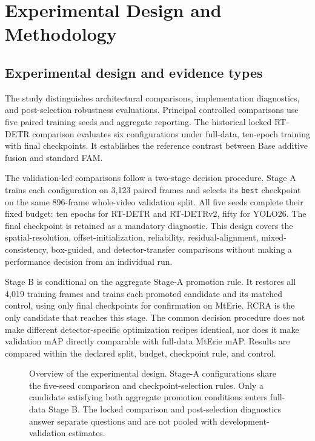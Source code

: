 \chapter{Experimental Design and Methodology}
\label{chap:methodology}

\section{Experimental design and evidence types}

The study distinguishes architectural comparisons, implementation diagnostics,
and post-selection robustness evaluations. Principal controlled comparisons use
five paired training seeds and aggregate reporting.
The historical locked RT-DETR comparison evaluates six configurations under
full-data, ten-epoch training with final checkpoints. It establishes the
reference contrast between Base additive fusion and standard FAM.

The validation-led comparisons follow a two-stage decision procedure.
Stage A trains each configuration on 3,123 paired frames and selects its
\texttt{best} checkpoint on the same 896-frame whole-video validation split.
All five seeds complete their fixed budget: ten epochs for RT-DETR and
RT-DETRv2, fifty for YOLO26. The final checkpoint is retained as a mandatory
diagnostic. This design covers the spatial-resolution, offset-initialization,
reliability, residual-alignment, mixed-consistency, box-guided, and
detector-transfer comparisons without making a performance decision from an
individual run.

Stage B is conditional on the aggregate Stage-A promotion rule. It restores
all 4,019 training frames and trains each promoted candidate and its matched
control, using only final checkpoints for confirmation on MtErie.
RCRA is the only candidate that reaches this stage. The common decision
procedure does not make different detector-specific optimization recipes
identical, nor does it make validation mAP directly comparable with full-data
MtErie mAP. Results are compared within the declared split, budget,
checkpoint rule, and control.

\begin{figure}[H]
  \centering
  \caption{Overview of the experimental design. Stage-A configurations share
  the five-seed comparison and
  checkpoint-selection rules. Only a candidate satisfying both aggregate
  promotion conditions enters full-data Stage B. The locked comparison and
  post-selection diagnostics answer separate questions and are not pooled
  with development-validation estimates.}
  \label{fig:experimental-design}
\end{figure}

